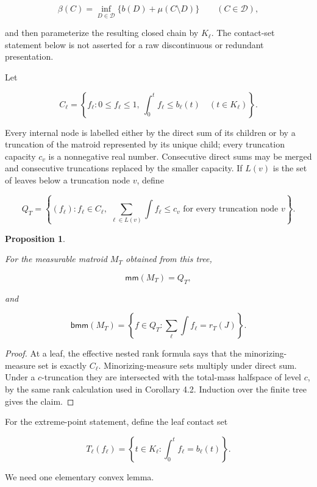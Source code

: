 \documentclass[11pt]{article}
\newtheorem{proposition}[theorem]{Proposition}
\numberwithin{equation}{section}
\begin{document}
\nopagebreak[4]
\[
\beta(C)=\inf_{D\in\mathcal D}\{b(D)+\mu(C\setminus D)\}
\qquad(C\in\mathcal D),
\]

and then parameterize the resulting closed chain by $K_\ell$. The contact-set statement
below is not asserted for a raw discontinuous or redundant presentation.

Let

\nopagebreak[4]
\[
C_\ell=
\left\{f_\ell:0\le f_\ell\le1,
\ \int_0^t f_\ell\le b_\ell(t)\quad(t\in K_\ell)
\right\}.
\]

Every internal node is labelled either by the direct sum of its children or by a
truncation of the matroid represented by its unique child; every truncation capacity
$c_v$ is a nonnegative real number. Consecutive direct sums may be merged and
consecutive truncations replaced by the smaller capacity. If $L(v)$ is the set of
leaves below a truncation node $v$, define

\nopagebreak[4]
\[
Q_T=\left\{(f_\ell):
f_\ell\in C_\ell,
\ \sum_{\ell\in L(v)}\int f_\ell\le c_v
\text{ for every truncation node }v
\right\}.
\]

\begin{proposition}
\label{prop:laminar-mm}

For the measurable matroid $M_T$ obtained from this tree,

\nopagebreak[4]
\[
\mathsf{mm}(M_T)=Q_T,
\]

and

\nopagebreak[4]
\[
\mathsf{bmm}(M_T)
=\left\{f\in Q_T:\sum_\ell\int f_\ell=r_T(J)\right\}.
\]

\end{proposition}

\begin{proof}

At a leaf, the effective nested rank formula says that the minorizing-measure set is
exactly $C_\ell$. Minorizing-measure sets multiply under direct sum. Under a
$c$-truncation they are intersected with the total-mass halfspace of level $c$, by the
same rank calculation used in Corollary 4.2. Induction over the finite tree gives the
claim.
\end{proof}


For the extreme-point statement, define the leaf contact set

\nopagebreak[4]
\[
T_\ell(f_\ell)
=\left\{t\in K_\ell:\int_0^t f_\ell=b_\ell(t)\right\}.
\]

We need one elementary convex lemma.
\end{document}
